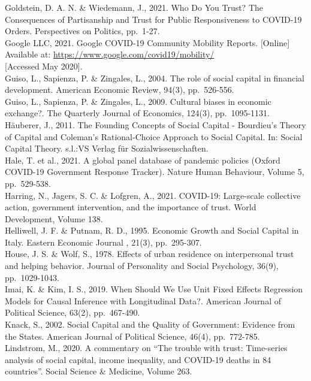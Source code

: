 \documentclass[
  11pt,
]{article}
\begin{document}
Goldstein, D. A. N. \& Wiedemann, J., 2021. Who Do You Trust? The Consequences of Partisanship and Trust for Public Responsiveness to COVID-19 Orders. Perspectives on Politics, pp.~1-27.\\
Google LLC, 2021. Google COVID-19 Community Mobility Reports. {[}Online{]}\\
Available at: \url{https://www.google.com/covid19/mobility/}\\
{[}Accessed May 2020{]}.\\
Guiso, L., Sapienza, P. \& Zingales, L., 2004. The role of social capital in financial development. American Economic Review, 94(3), pp.~526-556.\\
Guiso, L., Sapienza, P. \& Zingales, L., 2009. Cultural biases in economic exchange?. The Quarterly Journal of Economics, 124(3), pp.~1095-1131.\\
Häuberer, J., 2011. The Founding Concepts of Social Capital - Bourdieu's Theory of Capital and Coleman's Rational-Choice Approach to Social Capital. In: Social Capital Theory. s.l.:VS Verlag für Sozialwissenschaften.\\
Hale, T. et al., 2021. A global panel database of pandemic policies (Oxford COVID-19 Government Response Tracker). Nature Human Behaviour, Volume 5, pp.~529-538.\\
Harring, N., Jagers, S. C. \& Lofgren, A., 2021. COVID-19: Large-scale collective action, government intervention, and the importance of trust. World Development, Volume 138.\\
Helliwell, J. F. \& Putnam, R. D., 1995. Economic Growth and Social Capital in Italy. Eastern Economic Journal , 21(3), pp.~295-307.\\
House, J. S. \& Wolf, S., 1978. Effects of urban residence on interpersonal trust and helping behavior. Journal of Personality and Social Psychology, 36(9), pp.~1029-1043.\\
Imai, K. \& Kim, I. S., 2019. When Should We Use Unit Fixed Effects Regression Models for Causal Inference with Longitudinal Data?. American Journal of Political Science, 63(2), pp.~467-490.\\
Knack, S., 2002. Social Capital and the Quality of Government: Evidence from the States. American Journal of Political Science, 46(4), pp.~772-785.\\
Lindstrom, M., 2020. A commentary on ``The trouble with trust: Time-series analysis of social capital, income inequality, and COVID-19 deaths in 84 countries''. Social Science \& Medicine, Volume 263.\\
\end{document}
